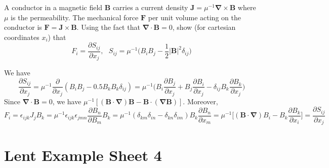 \documentclass[a4paper]{article}
\begin{document}
\begin{qns}
A conductor in a magnetic field $\mathbf{B}$ carries a current density $\mathbf{J}=\mu^{-1}\boldsymbol{\nabla}\times\mathbf{B}$ where $\mu$ is the permeability. The mechanical force $\mathbf{F}$ per unit volume acting on the conductor is $\mathbf{F}=\mathbf{J}\times\mathbf{B}$. Using the fact that $\boldsymbol{\nabla}\cdot\mathbf{B}=0$, show (for cartesian coordinates $x_i$) that
$$F_i=\frac{\partial S_{ij}}{\partial x_j},\text{  }S_{ij}=\mu^{-1}\bigg(B_iB_j-\frac{1}{2}|\mathbf{B}|^2\delta_{ij}\bigg)$$
\end{qns}
\begin{ans}
We have
$$\frac{\partial S_{ij}}{\partial x_j}=\mu^{-1}\frac{\partial}{\partial x_j}(B_iB_j-0.5B_kB_k\delta_{ij})=\mu^{-1}\bigg(B_i\frac{\partial B_j}{\partial x_j}+B_j\frac{\partial B_i}{\partial x_j}-\delta_{ij}B_k\frac{\partial B_k}{\partial x_j}\bigg)$$
Since $\boldsymbol{\nabla}\cdot\mathbf{B}=0$, we have $\mu^{-1}[(\mathbf{B}\cdot\boldsymbol{\nabla})\mathbf{B}-\mathbf{B}\cdot(\boldsymbol{\nabla}\mathbf{B})]$. Moreover, 
$$F_i=\epsilon_{ijk}J_jB_k=\mu^{-1}\epsilon_{ijk}\epsilon_{jmn}\frac{\partial B_n}{\partial B_m}B_k=\mu^{-1}(\delta_{km}\delta_{in}-\delta_{kn}\delta_{im})B_k\frac{\partial B_n}{\partial x_m}=\mu^{-1}\bigg[(\mathbf{B}\cdot\boldsymbol{\nabla})B_i-B_k\frac{\partial B_k}{\partial x_i}\bigg]=\frac{\partial S_{ij}}{\partial x_j}$$
\end{ans}
\newpage
\section{Lent Example Sheet 4}
\end{document}
